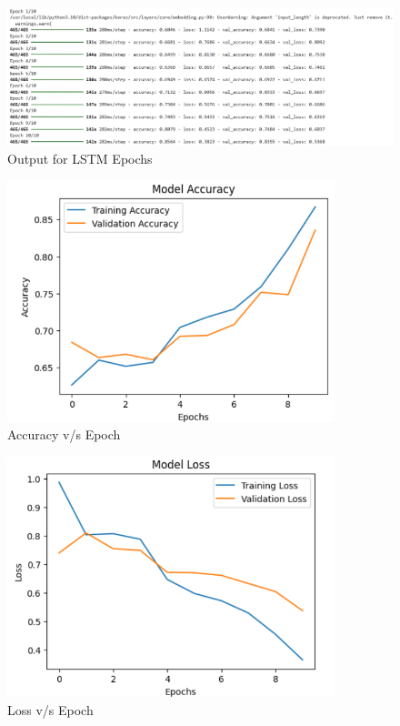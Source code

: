 \begin{figure}[h!]  
    \centering
    \includegraphics[width=1.0\textwidth]{Images/LSTM Epoch.png}  
    \caption{Output for LSTM Epochs}
    \label{LSTm Epochs}  %
\end{figure}

\begin{figure}[h!]  
    \centering
    \includegraphics[width=0.85\textwidth]{Images/LSTM Accuracy v Epoch.png}  
    \caption{Accuracy v/s Epoch}
    \label{Accuracy vs Epoch LSTM}  %
\end{figure}

\begin{figure}[h!]  
    \centering
    \includegraphics[width=0.85\textwidth]{Images/LSTM Loss v Epoch.png}  
    \caption{Loss v/s Epoch}
    \label{Loss vs Epoch LSTM}  %
\end{figure}


